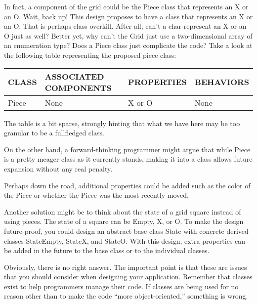 In fact, a component of the grid could be the Piece class that represents an X or an O.
Wait, back up! This design proposes to have a class that represents an X or an O. That is perhaps class overkill. After all, can’t a char represent an X or an O just as well? Better yet, why can’t the Grid just use a two-dimensional array of an enumeration type? Does a Piece class just complicate the code? Take a look at the following table representing the proposed piece class:

\begin{longtable}{|l|l|l|l|}
\hline
\textbf{CLASS} & \textbf{ASSOCIATED COMPONENTS} & \textbf{PROPERTIES} & \textbf{BEHAVIORS} \\ \hline
\endfirsthead
%
\endhead
%
Piece          & None                           & X or O              & None               \\ \hline
\end{longtable}

The table is a bit sparse, strongly hinting that what we have here may be too granular to be a fullfledged class.

On the other hand, a forward-thinking programmer might argue that while Piece is a pretty meager class as it currently stands, making it into a class allows future expansion without any real penalty.

Perhaps down the road, additional properties could be added such as the color of the Piece or whether the Piece was the most recently moved.

Another solution might be to think about the state of a grid square instead of using pieces. The state of a square can be Empty, X, or O. To make the design future-proof, you could design an abstract base class State with concrete derived classes StateEmpty, StateX, and StateO. With this design, extra properties can be added in the future to the base class or to the individual classes.

Obviously, there is no right answer. The important point is that these are issues that you should consider when designing your application. Remember that classes exist to help programmers manage their code. If classes are being used for no reason other than to make the code “more object-oriented,” something is wrong.


